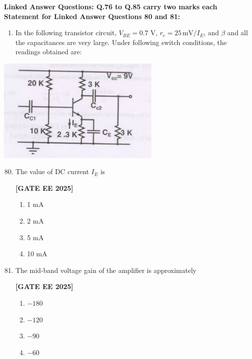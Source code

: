 \documentclass[12pt]{article}
\begin{document}
\vspace{1em}
 \large \textbf {Linked Answer Questions: Q.76 to Q.85 carry two marks each}
 \large \textbf {Statement for Linked Answer Questions 80 and 81: }
\vspace{1em}
\begin{enumerate}
\item In the following transistor circuit, $V_{BE}=0.7$ V, $r_e = 25\,\text{mV}/I_E$, and $\beta$ and all the capacitances are very large. Under following switch conditions, the readings obtained are:
\end{enumerate}
\begin{center}
\includegraphics[width=0.6\textwidth]{figs/q8081.png}
\end{center}

\begin{enumerate}[leftmargin=*, label=\textbf{Q.\arabic*:}]
\setcounter{enumi}{79}

\item The value of DC current $I_E$ is
 
\noindent \textbf{[GATE EE 2025]}
\begin{enumerate}[label=(\Alph*)]
  \item 1 mA
  \item 2 mA
  \item 5 mA
  \item 10 mA
\end{enumerate}

\item The mid-band voltage gain of the amplifier is approximately
 
\noindent \textbf{[GATE EE 2025]}
\begin{enumerate}[label=(\Alph*)]
  \item $-180$
  \item $-120$
  \item $-90$
  \item $-60$
\end{enumerate}

\end{enumerate}
\end{document}
